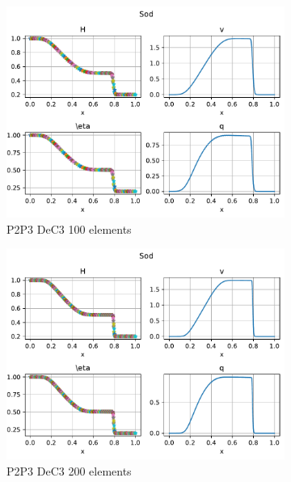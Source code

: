 \documentclass[english]{article}
\theoremstyle{thmstyleone}
\theoremstyle{thmstyletwo}
\theoremstyle{thmstylethree}
\begin{document}
\begin{figure}
{\begin{minipage}{\textwidth}
\begin{subfigure}{0.45\textwidth}
				\includegraphics[trim= 0 180 0 0, clip,width=\textwidth]{figures/sod/P2P3_DeC_N_el00100.pdf}
				\caption{P2P3 DeC3 100 elements}
			\end{subfigure}
			\begin{subfigure}{0.45\textwidth}
				\includegraphics[trim= 0 180 0 0, clip,width=\textwidth]{figures/sod/P2P3_DeC_N_el00200.pdf}
				\caption{P2P3 DeC3 200 elements}
			\end{subfigure}
			\begin{subfigure}{0.45\textwidth}

\end{subfigure}
\end{minipage}}
\end{figure}
\end{document}
